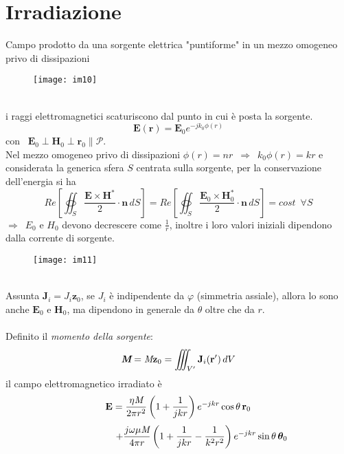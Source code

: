 \documentclass[a4paper]{article}
\begin{document}
\section{Irradiazione}
Campo prodotto da una sorgente elettrica "puntiforme" in un mezzo omogeneo privo di dissipazioni
\begin{figure}[ht] 
\centering
\texttt{[image: im10]}
\end{figure}
\\i raggi elettromagnetici scaturiscono dal punto in cui è posta la sorgente.
\begin{equation*}
\textbf{E}(\textbf{r})=\textbf{E}_0e^{-jk_0\phi(r)}
\end{equation*}
con $\,\,\,\textbf{E}_0\perp\textbf{H}_0\perp\textbf{r}_0\parallel\bm{\mathcal{P}}$.\\
Nel mezzo omogeneo privo di dissipazioni $\phi(r)=nr\,\,\,\Rightarrow\,\,\,k_0\phi(r)=kr$ e considerata la generica sfera $S$ centrata sulla sorgente, per la conservazione dell'energia si ha
\begin{equation*}
Re\left[\oiint_S\frac{\textbf{E}\times\textbf{H}^*}{2}\cdot\textbf{n}\,dS\right]=Re\left[\oiint_S\frac{\textbf{E}_0\times\textbf{H}_0^*}{2}\cdot\textbf{n}\,dS\right]=cost\,\,\,\forall S
\end{equation*}
$\Rightarrow\,\,\,E_0$ e $H_0$ devono decrescere come $\frac{1}{r}$, inoltre i loro valori iniziali dipendono dalla corrente di sorgente.
\begin{figure}[ht] 
\centering
\texttt{[image: im11]}
\end{figure}
\\Assunta $\textbf{J}_i=J_i\textbf{z}_0$, se $J_i$ è indipendente da $\varphi$ (simmetria assiale), allora lo sono anche $\textbf{E}_0$ e $\textbf{H}_0$, ma dipendono in generale da $\theta$ oltre che da $r$.\\\\
Definito il \emph{momento della sorgente}:
\begin{equation*}
\emph{\textbf{M}}=\emph{M}\textbf{z}_0=\iiint_{V'}\textbf{J}_i(\textbf{r}')\,dV
\end{equation*}
il campo elettromagnetico irradiato è
\begin{equation*}
\textbf{E}=\frac{\eta\emph{M}}{2\pi r^2}\left(1+\frac{1}{jkr}\right)e^{-jkr}\cos\theta\,\textbf{r}_0
\end{equation*}
\begin{equation*}
\hspace*{17mm}+\frac{j\omega\mu\emph{M}}{4\pi r}\left(1+\frac{1}{jkr}-\frac{1}{k^2r^2}\right)e^{-jkr}\sin\theta\,\bm{\theta}_0
\end{equation*}
\end{document}
